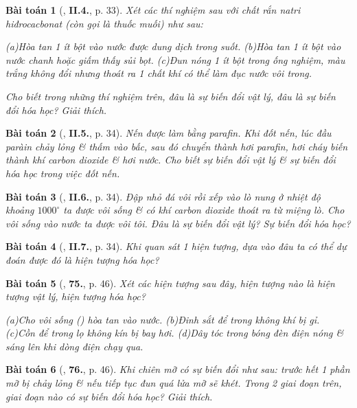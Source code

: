 \documentclass{article}
\numberwithin{equation}{section}
\newtheorem{baitoan}{Bài toán}
\begin{document}
\begin{baitoan}[\cite{Truong_BTNC_Hoa_Hoc_8_2022}, \textbf{II.4.}, p. 33]
	Xét các thí nghiệm sau với chất rắn natri hiđrocacbonat \emph{} (còn gọi là \emph{thuốc muối}) như sau:
	
		(a)Hòa tan 1 ít bột \emph{} vào nước được dung dịch trong suốt.
		(b)Hòa tan 1 ít bột \emph{} vào nước chanh hoặc giấm thấy sủi bọt.
		(c)Đun nóng 1 ít bột \emph{} trong ống nghiệm, màu trắng không đổi nhưng thoát ra 1 chất khí có thể làm đục nước vôi trong.
	
	Cho biết trong những thí nghiệm trên, đâu là sự biến đổi vật lý, đâu là sự biến đổi hóa học? Giải thích.
\end{baitoan}

\begin{baitoan}[\cite{Truong_BTNC_Hoa_Hoc_8_2022}, \textbf{II.5.}, p. 34]
	Nến được làm bằng parafin. Khi đốt nến, lúc đầu paràin chảy lỏng \& thấm vào bấc, sau đó chuyển thành hơi parafin, hơi cháy biến thành khí carbon dioxide \& hơi nước. Cho biết sự biến đổi vật lý \& sự biến đổi hóa học trong việc đốt nến.
\end{baitoan}

\begin{baitoan}[\cite{Truong_BTNC_Hoa_Hoc_8_2022}, \textbf{II.6.}, p. 34]
	Đập nhỏ đá vôi rồi xếp vào lò nung ở nhiệt độ khoảng $1000^\circ$ ta được vôi sống \& có khí carbon dioxide thoát ra từ miệng lò. Cho vôi sống vào nước ta được vôi tôi. Đâu là sự biến đổi vật lý? Sự biến đổi hóa học?
\end{baitoan}

\begin{baitoan}[\cite{Truong_BTNC_Hoa_Hoc_8_2022}, \textbf{II.7.}, p. 34]
	Khi quan sát 1 hiện tượng, dựa vào đâu ta có thể dự đoán được đó là hiện tượng hóa học?
\end{baitoan}

\begin{baitoan}[\cite{An_400_BT_Hoa_Hoc_8_2020}, \textbf{75.}, p. 46]
	Xét các hiện tượng sau đây, hiện tượng nào là hiện tượng vật lý, hiện tượng hóa học?
	
		(a)Cho vôi sống () hòa tan vào nước.
		(b)Đinh sắt để trong không khí bị gỉ.
		(c)Cồn để trong lọ không kín bị bay hơi.
		(d)Dây tóc trong bóng đèn điện nóng \& sáng lên khi dòng điện chạy qua.
	
\end{baitoan}

\begin{baitoan}[\cite{An_400_BT_Hoa_Hoc_8_2020}, \textbf{76.}, p. 46]
	Khi chiên mỡ có sự biến đổi như sau: trước hết 1 phần mỡ bị chảy lỏng \& nếu tiếp tục đun quá lửa mỡ sẽ khét. Trong 2 giai đoạn trên, giai đoạn nào có sự biến đổi hóa học? Giải thích.
\end{baitoan}
\end{document}
